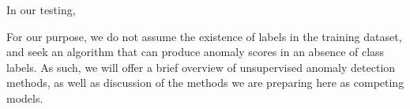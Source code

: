   In our testing, 

For our purpose, we do not assume the existence of labels in the training dataset, and seek an
  algorithm that can produce anomaly scores in an absence of class labels. As such, we will offer
  a brief overview of unsupervised anomaly detection methods, as well as discussion of the methods
  we are preparing here as competing models.









